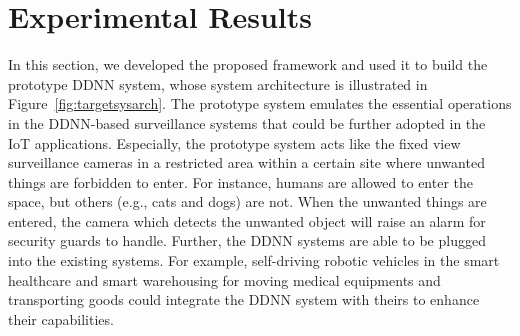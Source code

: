 \documentclass[conference]{IEEEtran}
\def\figurename{Figure}
\begin{document}

%
%
%
%

\section{Experimental Results}
\label{sec:results}
In this section, we developed the proposed framework and used it to build the prototype DDNN system, whose system architecture is illustrated in \figurename~\ref{fig:targetsysarch}. The prototype system emulates the essential operations in the DDNN-based surveillance systems that could be further adopted in the IoT applications. Especially, the prototype system acts like the fixed view surveillance cameras in a restricted area within a certain site where unwanted things are forbidden to enter. For instance, humans are allowed to enter the space, but others (e.g., cats and dogs) are not. When the unwanted things are entered, the camera which detects the unwanted object will raise an alarm for security guards to handle. Further, the DDNN systems are able to be plugged into the existing systems. For example, self-driving robotic vehicles in the smart healthcare and smart warehousing for moving medical equipments and transporting goods could integrate the DDNN system with theirs to enhance their capabilities.
\end{document}

